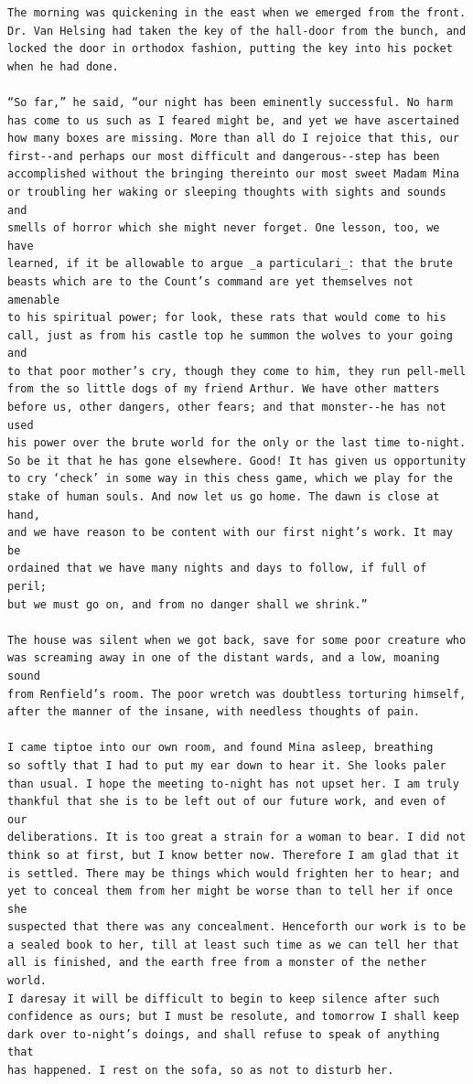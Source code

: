 \documentclass{article}
\begin{document}
\begin{verbatim}
The morning was quickening in the east when we emerged from the front.
Dr. Van Helsing had taken the key of the hall-door from the bunch, and
locked the door in orthodox fashion, putting the key into his pocket
when he had done.

“So far,” he said, “our night has been eminently successful. No harm
has come to us such as I feared might be, and yet we have ascertained
how many boxes are missing. More than all do I rejoice that this, our
first--and perhaps our most difficult and dangerous--step has been
accomplished without the bringing thereinto our most sweet Madam Mina
or troubling her waking or sleeping thoughts with sights and sounds and
smells of horror which she might never forget. One lesson, too, we have
learned, if it be allowable to argue _a particulari_: that the brute
beasts which are to the Count’s command are yet themselves not amenable
to his spiritual power; for look, these rats that would come to his
call, just as from his castle top he summon the wolves to your going and
to that poor mother’s cry, though they come to him, they run pell-mell
from the so little dogs of my friend Arthur. We have other matters
before us, other dangers, other fears; and that monster--he has not used
his power over the brute world for the only or the last time to-night.
So be it that he has gone elsewhere. Good! It has given us opportunity
to cry ‘check’ in some way in this chess game, which we play for the
stake of human souls. And now let us go home. The dawn is close at hand,
and we have reason to be content with our first night’s work. It may be
ordained that we have many nights and days to follow, if full of peril;
but we must go on, and from no danger shall we shrink.”

The house was silent when we got back, save for some poor creature who
was screaming away in one of the distant wards, and a low, moaning sound
from Renfield’s room. The poor wretch was doubtless torturing himself,
after the manner of the insane, with needless thoughts of pain.

I came tiptoe into our own room, and found Mina asleep, breathing
so softly that I had to put my ear down to hear it. She looks paler
than usual. I hope the meeting to-night has not upset her. I am truly
thankful that she is to be left out of our future work, and even of our
deliberations. It is too great a strain for a woman to bear. I did not
think so at first, but I know better now. Therefore I am glad that it
is settled. There may be things which would frighten her to hear; and
yet to conceal them from her might be worse than to tell her if once she
suspected that there was any concealment. Henceforth our work is to be
a sealed book to her, till at least such time as we can tell her that
all is finished, and the earth free from a monster of the nether world.
I daresay it will be difficult to begin to keep silence after such
confidence as ours; but I must be resolute, and tomorrow I shall keep
dark over to-night’s doings, and shall refuse to speak of anything that
has happened. I rest on the sofa, so as not to disturb her.


\end{verbatim}
\end{document}
